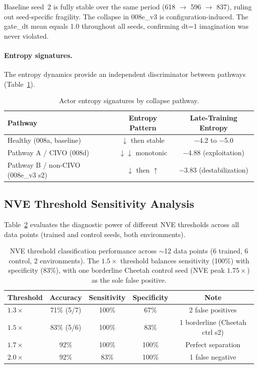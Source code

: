 \documentclass[10pt,letterpaper]{article}
\begin{document}
Baseline seed~2 is fully stable over the same period (618 $\rightarrow$ 596 $\rightarrow$ 837), ruling out seed-specific fragility.
The collapse in 008e\_v3 is configuration-induced.
The gate\_dt mean equals 1.0 throughout all seeds, confirming dt=1 imagination was never violated.

\paragraph{Entropy signatures.}
The entropy dynamics provide an independent discriminator between pathways (Table~\ref{tab:entropy}).

\begin{table}[h]
\centering
\caption{Actor entropy signatures by collapse pathway.}
\label{tab:entropy}
\begin{tabular}{lcc}
\toprule
Pathway & Entropy Pattern & Late-Training Entropy \\
\midrule
Healthy (008a, baseline) & $\downarrow$ then stable & $-$4.2 to $-$5.0 \\
Pathway A / CIVO (008d) & $\downarrow\downarrow$ monotonic & $-$4.88 (exploitation) \\
Pathway B / non-CIVO (008e\_v3 s2) & $\downarrow$ then $\uparrow$ & $-$3.83 (destabilization) \\
\bottomrule
\end{tabular}
\end{table}

\subsection{NVE Threshold Sensitivity Analysis}
\label{sec:threshold}

Table~\ref{tab:threshold_sensitivity} evaluates the diagnostic power of different NVE thresholds across all data points (trained and control seeds, both environments).

\begin{table}[h]
\centering
\caption{NVE threshold classification performance across $\sim$12 data points (6 trained, 6 control, 2 environments). The $1.5\times$ threshold balances sensitivity (100\%) with specificity (83\%), with one borderline Cheetah control seed (NVE peak $1.75\times$) as the sole false positive.}
\label{tab:threshold_sensitivity}
\begin{tabular}{lcccc}
\toprule
Threshold & Accuracy & Sensitivity & Specificity & Note \\
\midrule
$1.3\times$ & 71\% (5/7) & 100\% & 67\% & 2 false positives \\
$1.5\times$ & 83\% (5/6) & 100\% & 83\% & 1 borderline (Cheetah ctrl s2) \\
$1.7\times$ & 92\% & 100\% & 100\% & Perfect separation \\
$2.0\times$ & 92\% & 83\% & 100\% & 1 false negative \\
\bottomrule
\end{tabular}
\end{table}
\end{document}
